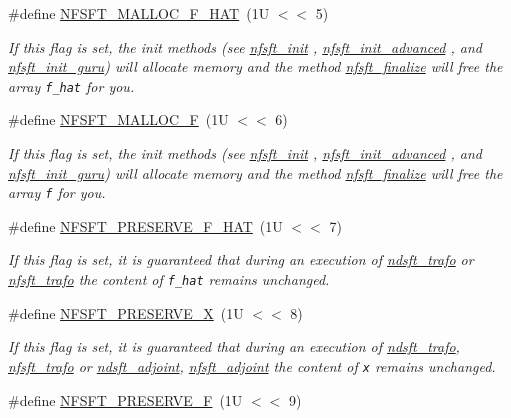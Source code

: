 \begin{CompactItemize}
\#define \hyperlink{group__nfsft_ga29}{NFSFT\_\-MALLOC\_\-F\_\-HAT}~(1U $<$$<$ 5)
\begin{CompactList}\small\item\em If this flag is set, the init methods (see \hyperlink{group__nfsft_ga1}{nfsft\_\-init} , \hyperlink{group__nfsft_ga2}{nfsft\_\-init\_\-advanced} , and \hyperlink{group__nfsft_ga3}{nfsft\_\-init\_\-guru}) will allocate memory and the method \hyperlink{group__nfsft_ga10}{nfsft\_\-finalize} will free the array {\tt f\_\-hat} for you. \item\end{CompactList}\item 
\#define \hyperlink{group__nfsft_ga30}{NFSFT\_\-MALLOC\_\-F}~(1U $<$$<$ 6)
\begin{CompactList}\small\item\em If this flag is set, the init methods (see \hyperlink{group__nfsft_ga1}{nfsft\_\-init} , \hyperlink{group__nfsft_ga2}{nfsft\_\-init\_\-advanced} , and \hyperlink{group__nfsft_ga3}{nfsft\_\-init\_\-guru}) will allocate memory and the method \hyperlink{group__nfsft_ga10}{nfsft\_\-finalize} will free the array {\tt f} for you. \item\end{CompactList}\item 
\#define \hyperlink{group__nfsft_ga31}{NFSFT\_\-PRESERVE\_\-F\_\-HAT}~(1U $<$$<$ 7)
\begin{CompactList}\small\item\em If this flag is set, it is guaranteed that during an execution of \hyperlink{group__nfsft_ga6}{ndsft\_\-trafo} or \hyperlink{group__nfsft_ga8}{nfsft\_\-trafo} the content of {\tt f\_\-hat} remains unchanged. \item\end{CompactList}\item 
\#define \hyperlink{group__nfsft_ga32}{NFSFT\_\-PRESERVE\_\-X}~(1U $<$$<$ 8)
\begin{CompactList}\small\item\em If this flag is set, it is guaranteed that during an execution of \hyperlink{group__nfsft_ga6}{ndsft\_\-trafo}, \hyperlink{group__nfsft_ga8}{nfsft\_\-trafo} or \hyperlink{group__nfsft_ga7}{ndsft\_\-adjoint}, \hyperlink{group__nfsft_ga9}{nfsft\_\-adjoint} the content of {\tt x} remains unchanged. \item\end{CompactList}\item 
\#define \hyperlink{group__nfsft_ga33}{NFSFT\_\-PRESERVE\_\-F}~(1U $<$$<$ 9)
$$
\end{CompactItemize}
